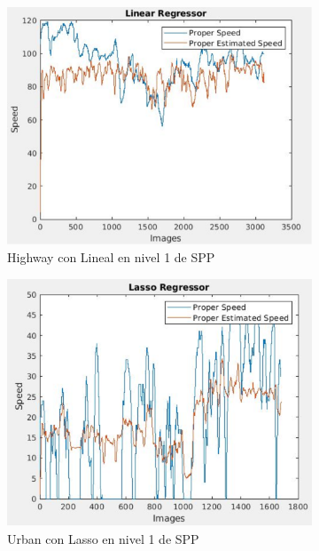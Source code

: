 \begin{figure}[H]
  \centering
  \begin{subfigure}[b]{0.45\linewidth}
    \includegraphics[width=\linewidth]{Figuras/Lineal_Highway(Nivel_1).eps}
    \caption{Highway con Lineal en nivel 1 de \ac{SPP}}
  \end{subfigure}
    \begin{subfigure}[b]{0.425\linewidth}
    \includegraphics[width=\linewidth]{Figuras/Lasso_Urban(Nivel_1).eps}
    \caption{Urban con Lasso en nivel 1 de \ac{SPP}}
  \end{subfigure}
    \begin{subfigure}[b]{0.45\linewidth}

\end{subfigure}
\end{figure}
